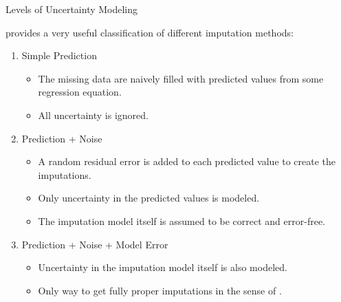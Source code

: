 \documentclass{beamer}\usepackage[]{graphicx}\usepackage[]{color}
\begin{document}
\begin{frame}[shrink = 5]{Levels of Uncertainty Modeling}

  \citet{vanBuuren:2012} provides a very useful classification of different 
  imputation methods:
  \vb
  \begin{enumerate}
  \item Simple Prediction
    \begin{itemize}
    \item The missing data are naively filled with predicted values from some 
      regression equation.
    \item All uncertainty is ignored.
    \end{itemize}
    \vb
  \item Prediction + Noise
    \begin{itemize}
    \item A random residual error is added to each predicted value to create the 
      imputations.
    \item Only uncertainty in the predicted values is modeled.
    \item The imputation model itself is assumed to be correct and error-free.
    \end{itemize}
    \vb
  \item Prediction + Noise + Model Error
    \begin{itemize}
    \item Uncertainty in the imputation model itself is also modeled.
    \item Only way to get fully proper imputations in the sense of 
      \citet{rubin:1987}.
    \end{itemize}
  \end{enumerate}
  
\end{frame}

\end{document}
